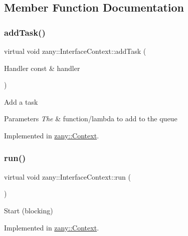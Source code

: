 \subsection{Member Function Documentation}
\mbox{\label{classzany_1_1_interface_context_a56da6cf74ba78321a0ebe0b334175176}} 
\subsubsection{\texorpdfstring{add\+Task()}{addTask()}}
{\footnotesize\ttfamily virtual void zany\+::\+Interface\+Context\+::add\+Task (\begin{DoxyParamCaption}\item[{Handler const \&}]{handler }\end{DoxyParamCaption})\hspace{0.3cm}{\ttfamily [pure virtual]}}

Add a task


\begin{DoxyParams}{Parameters}
{\em The} & function/lambda to add to the queue \\
\hline
\end{DoxyParams}


Implemented in \hyperlink{classzany_1_1_context_a448dcb8a627491eb4c8de0f46cd13ab1}{zany\+::\+Context}.

\mbox{\label{classzany_1_1_interface_context_a225552253490052c2fb75f05169b16a7}} 
\subsubsection{\texorpdfstring{run()}{run()}}
{\footnotesize\ttfamily virtual void zany\+::\+Interface\+Context\+::run (\begin{DoxyParamCaption}{ }\end{DoxyParamCaption})\hspace{0.3cm}{\ttfamily [pure virtual]}}

Start (blocking) 

Implemented in \hyperlink{classzany_1_1_context_af7642e436736dbe466c476b56435d90f}{zany\+::\+Context}.

